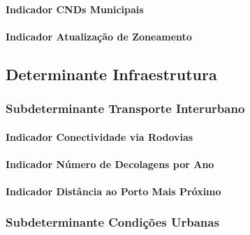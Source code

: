 \documentclass[
  12,
  dvipsnames]{article}
\begin{document}
\hypertarget{indicador-cnds-municipais}{%
\paragraph{Indicador CNDs Municipais}\label{indicador-cnds-municipais}}

\hypertarget{indicador-atualizauxe7uxe3o-de-zoneamento}{%
\paragraph{Indicador Atualização de
Zoneamento}\label{indicador-atualizauxe7uxe3o-de-zoneamento}}

\hypertarget{determinante-infraestrutura}{%
\subsection{Determinante
Infraestrutura}\label{determinante-infraestrutura}}

\hypertarget{subdeterminante-transporte-interurbano}{%
\subsubsection{Subdeterminante Transporte
Interurbano}\label{subdeterminante-transporte-interurbano}}

\hypertarget{indicador-conectividade-via-rodovias}{%
\paragraph{Indicador Conectividade via
Rodovias}\label{indicador-conectividade-via-rodovias}}

\hypertarget{indicador-nuxfamero-de-decolagens-por-ano}{%
\paragraph{Indicador Número de Decolagens por
Ano}\label{indicador-nuxfamero-de-decolagens-por-ano}}

\hypertarget{indicador-distuxe2ncia-ao-porto-mais-pruxf3ximo}{%
\paragraph{Indicador Distância ao Porto Mais
Próximo}\label{indicador-distuxe2ncia-ao-porto-mais-pruxf3ximo}}

\hypertarget{subdeterminante-condiuxe7uxf5es-urbanas}{%
\subsubsection{Subdeterminante Condições
Urbanas}\label{subdeterminante-condiuxe7uxf5es-urbanas}}
\end{document}
